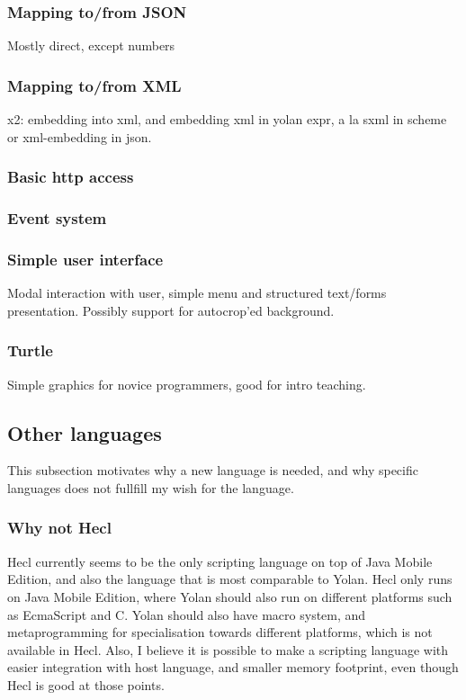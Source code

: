 \subsubsection{Mapping to/from JSON}
Mostly direct, except numbers
\subsubsection{Mapping to/from XML}
x2: embedding into xml, and embedding xml in yolan expr, a la sxml in scheme or xml-embedding in json.
\subsubsection{Basic http access}
\subsubsection{Event system}
\subsubsection{Simple user interface}
Modal interaction with user, simple menu and structured text/forms presentation.
Possibly support for autocrop'ed background.
\subsubsection{Turtle}
Simple graphics for novice programmers, good for intro teaching.

\subsection{Other languages}

This subsection motivates why a new language is needed, 
and why specific languages does not fullfill my wish for the language.

\subsubsection{Why not Hecl}
Hecl currently seems to be the only scripting language on top of Java Mobile Edition, and also the language that is most comparable to Yolan.
Hecl only runs on Java Mobile Edition, where Yolan should also run on different platforms such as EcmaScript and C. 
Yolan should also have macro system, and metaprogramming for specialisation towards different platforms, which is not available in Hecl.
Also, I believe it is possible to make a scripting language with easier integration with host language, and smaller memory footprint, even though Hecl is good at those points.

